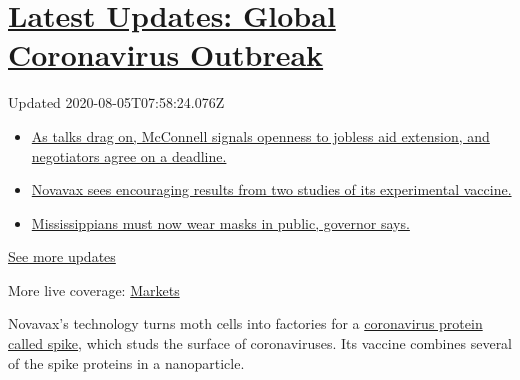 \hypertarget{latest-updates-global-coronavirus-outbreak}{%
\section{\texorpdfstring{\href{https://www.nytimes3xbfgragh.onion/2020/08/04/world/coronavirus-cases.html?action=click\&pgtype=Article\&state=default\&region=MAIN_CONTENT_1\&context=storylines_live_updates}{Latest
Updates: Global Coronavirus
Outbreak}}{Latest Updates: Global Coronavirus Outbreak}}\label{latest-updates-global-coronavirus-outbreak}}

Updated 2020-08-05T07:58:24.076Z

\begin{itemize}
\tightlist
\item
  \href{https://www.nytimes3xbfgragh.onion/2020/08/04/world/coronavirus-cases.html?action=click\&pgtype=Article\&state=default\&region=MAIN_CONTENT_1\&context=storylines_live_updates\#link-762df92}{As
  talks drag on, McConnell signals openness to jobless aid extension,
  and negotiators agree on a deadline.}
\item
  \href{https://www.nytimes3xbfgragh.onion/2020/08/04/world/coronavirus-cases.html?action=click\&pgtype=Article\&state=default\&region=MAIN_CONTENT_1\&context=storylines_live_updates\#link-1228a480}{Novavax
  sees encouraging results from two studies of its experimental
  vaccine.}
\item
  \href{https://www.nytimes3xbfgragh.onion/2020/08/04/world/coronavirus-cases.html?action=click\&pgtype=Article\&state=default\&region=MAIN_CONTENT_1\&context=storylines_live_updates\#link-794484ed}{Mississippians
  must now wear masks in public, governor says.}
\end{itemize}

\href{https://www.nytimes3xbfgragh.onion/2020/08/04/world/coronavirus-cases.html?action=click\&pgtype=Article\&state=default\&region=MAIN_CONTENT_1\&context=storylines_live_updates}{See
more updates}

More live coverage:
\href{https://www.nytimes3xbfgragh.onion/live/2020/08/04/business/stock-market-today-coronavirus?action=click\&pgtype=Article\&state=default\&region=MAIN_CONTENT_1\&context=storylines_live_updates}{Markets}

Novavax's technology turns moth cells into factories for a
\href{https://www.nytimes3xbfgragh.onion/2020/07/28/health/coronavirus-mutation-spike-treatment.html}{coronavirus
protein called spike}, which studs the surface of coronaviruses. Its
vaccine combines several of the spike proteins in a nanoparticle.

